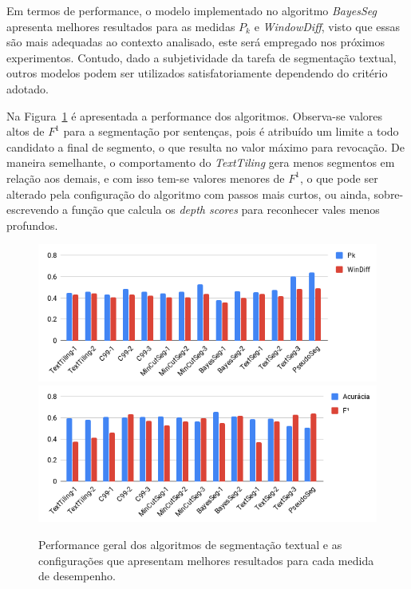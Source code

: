 Em termos de performance, o modelo implementado no algoritmo \textit{BayesSeg} apresenta melhores resultados para as medidas $P_k$ e \textit{WindowDiff}, visto que essas são mais adequadas ao contexto analisado, este será empregado nos próximos experimentos. Contudo, dado a subjetividade da tarefa de segmentação textual, outros modelos podem ser utilizados satisfatoriamente dependendo do critério adotado. 



Na Figura~\ref{fig:resumo-segmentadores} é apresentada a performance dos algoritmos.
Observa-se valores altos de $F^1$ para a segmentação por sentenças, pois é atribuído um limite a todo candidato a final de segmento, o que resulta no valor máximo para revocação. De maneira semelhante, o comportamento do \textit{TextTiling} gera menos segmentos em relação aos demais, e com isso tem-se valores menores de $F^1$, o que pode ser alterado pela configuração do algoritmo com passos mais curtos, ou ainda, sobre-escrevendo a função que calcula os \textit{depth scores} para reconhecer vales menos profundos.



\begin{figure}[!b] \centering     %

		\includegraphics[width=.82\textwidth]{conteudo/capitulos/figs/graficos/resumo-wd-pk.png}	
		\label{fig:resumo-wd-pka}
		\includegraphics[width=.82\textwidth]{conteudo/capitulos/figs/graficos/resumo-tradicionais.png}	
		\label{fig:resumo-tradicionaisa}
	\caption{Performance geral dos algoritmos de segmentação textual e as configurações que apresentam melhores resultados para cada medida de desempenho.}
	\label{fig:resumo-segmentadores}
\end{figure}




